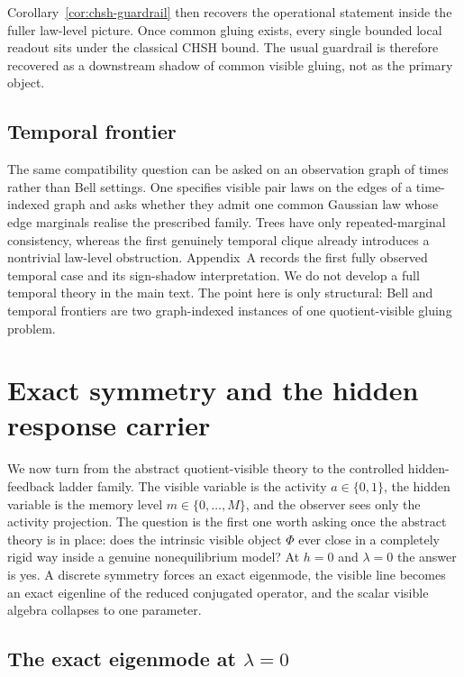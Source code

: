 \documentclass[11pt]{article}
\numberwithin{equation}{section}
\theoremstyle{thmcompact}
\theoremstyle{remark}
\begin{document}
Corollary~\ref{cor:chsh-guardrail} then recovers the operational statement inside the fuller law-level picture. Once common gluing exists, every single bounded local readout sits under the classical CHSH bound. The usual guardrail is therefore recovered as a downstream shadow of common visible gluing, not as the primary object.

\subsection{Temporal frontier}

The same compatibility question can be asked on an observation graph of times rather than Bell settings. One specifies visible pair laws on the edges of a time-indexed graph and asks whether they admit one common Gaussian law whose edge marginals realise the prescribed family. Trees have only repeated-marginal consistency, whereas the first genuinely temporal clique already introduces a nontrivial law-level obstruction. Appendix~A records the first fully observed temporal case and its sign-shadow interpretation. We do not develop a full temporal theory in the main text. The point here is only structural: Bell and temporal frontiers are two graph-indexed instances of one quotient-visible gluing problem.
\section{Exact symmetry and the hidden response carrier}
\label{sec:07_exact_symmetry}

We now turn from the abstract quotient-visible theory to the controlled hidden-feedback ladder family. The visible variable is the activity $a\in\{0,1\}$, the hidden variable is the memory level $m\in\{0,\dots,M\}$, and the observer sees only the activity projection. The question is the first one worth asking once the abstract theory is in place: does the intrinsic visible object $\Phi$ ever close in a completely rigid way inside a genuine nonequilibrium model? At $h=0$ and $\lambda=0$ the answer is yes. A discrete symmetry forces an exact eigenmode, the visible line becomes an exact eigenline of the reduced conjugated operator, and the scalar visible algebra collapses to one parameter.

\subsection{The exact eigenmode at $\lambda = 0$}
\end{document}
